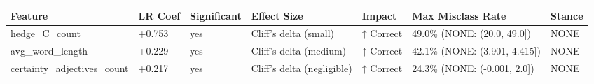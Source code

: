 \begin{tabular}{lllllll}
\toprule
Feature & LR Coef & Significant & Effect Size & Impact & Max Misclass Rate & Stance \\
\midrule
hedge\_C\_count & +0.753 & yes & Cliff's delta (small) & ↑ Correct & 49.0\% (NONE: (20.0, 49.0]) & NONE \\
avg\_word\_length & +0.229 & yes & Cliff's delta (medium) & ↑ Correct & 42.1\% (NONE: (3.901, 4.415]) & NONE \\
certainty\_adjectives\_count & +0.217 & yes & Cliff's delta (negligible) & ↑ Correct & 24.3\% (NONE: (-0.001, 2.0]) & NONE \\
\bottomrule
\end{tabular}
